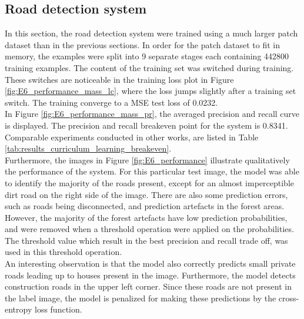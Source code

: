 \subsection{Road detection system}
\label{sec:results_road_detection_system}
In this section, the road detection system were trained using a much larger patch dataset than in the previous sections. In order for the patch dataset to fit in memory, the examples were split into 9 separate stages each containing 442800 training examples. The content of the training set was switched during training. These switches are noticeable in the training loss plot in Figure \ref{fig:E6_performance_mass_lc}, where the loss jumps slightly after a training set switch. The training converge to a \ac{MSE} test loss of 0.0232. \\

In Figure \ref{fig:E6_performance_mass_pr}, the averaged precision and recall curve is displayed. The precision and recall breakeven point for the system is 0.8341. Comparable experiments conducted in other works, are listed in Table \ref{tab:results_curriculum_learning_breakeven}.\\

Furthermore, the images in Figure \ref{fig:E6_performance} illustrate qualitatively the performance of the system. For this particular test image, the model was able to identify the majority of the roads present, except for an almost imperceptible dirt road on the right side of the image. There are also some prediction errors, such as roads being disconnected, and prediction artefacts in the forest areas. However, the majority of the forest artefacts have low prediction probabilities, and were removed when a threshold operation were applied on the probabilities. The threshold value which result in the best precision and recall trade off, was used in this threshold operation.\\

An interesting observation is that the model also correctly predicts small private roads leading up to houses present in the image. Furthermore, the model detects construction roads in the upper left corner. Since these roads are not present in the label image, the model is penalized for making these predictions by the cross-entropy loss function.\\

